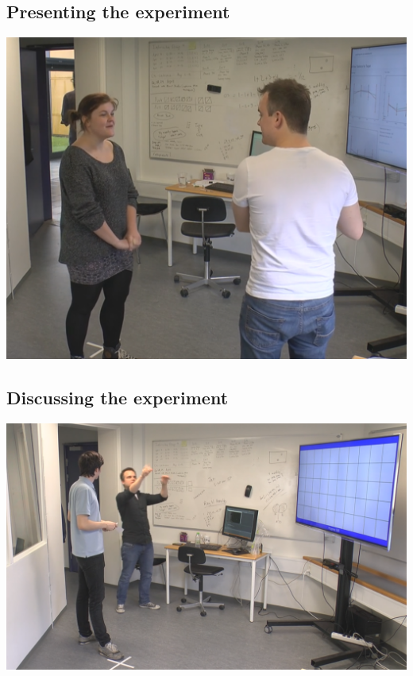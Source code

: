 \subsection*{Presenting the experiment}
\includegraphics[width=\textwidth]{files/introduction.png}

\subsection*{Discussing the experiment}
\includegraphics[width=\textwidth]{files/discussion.png}

